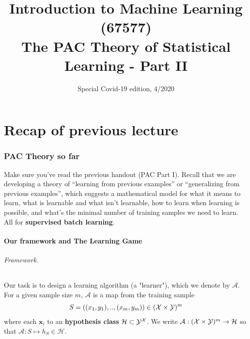 \documentclass[11pt]{article}
\title{{\large{Introduction to Machine Learning (67577) \\
\vphantom{} The PAC Theory of Statistical Learning - Part II}}}
\date{Special Covid-19 edition, 4/2020}
\newcommand{\Ac}{\mathcal{A}}
\newcommand{\Hc}{\mathcal{H}}
\begin{document}
\maketitle

\tableofcontents
\pagebreak


\part{Recap of previous lecture}

\section*{PAC Theory so far}

Make sure you've read the previous handout (PAC Part I). Recall that we are
developing a theory of ``learning from previous examples'' or ``generalizing
from previous examples'', which suggests a mathematical model for what it
means to learn, what is learnable and what isn't learnable, how to learn when
learning is possible, and what's the minimal number of training samples we need
to learn. All for {\bf supervised batch learning}.

\subsection*{Our framework and The Learning Game}



\paragraph{Framework.}

 Our task is to design a learning algorithm (a "learner"), which we denote by $\mathcal{A}$. For a given sample size $m$, $\mathcal{A}$  is a map from the training sample 
\[S=((x_1,y_1),..,(x_m,y_m)) \in (\mathcal{X}\times \mathcal{Y})^m\]
where each $\mathbf{x}_i$
to an {\bf hypothesis class}  $\Hc\subset \Y^\X$. We write
$\Ac:(\X\times\Y)^m\to \Hc$ so that $\Ac:S\mapsto h_S\in\Hc$.
\end{document}

